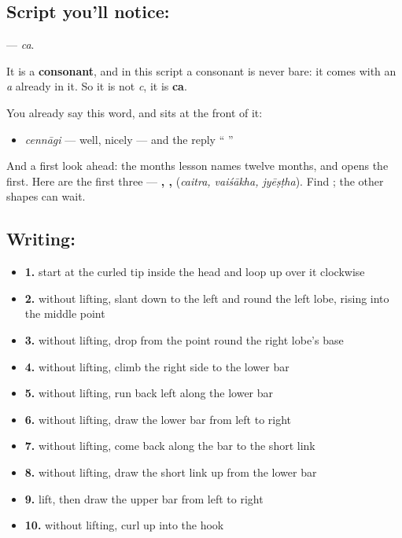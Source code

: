 \subsection*{Script you'll notice: }
\textbf{} — \emph{ca}.

It is a \textbf{consonant}, and in this script a consonant is never bare: it comes with an \emph{a} already in it. So it is not \emph{c}, it is \textbf{ca}.

You already say this word, and  sits at the front of it:

\begin{itemize}
\raggedright
  \item \textbf{} \emph{cennāgi} — well, nicely — and the reply \textquotedblleft{} \textquotedblright{}
\end{itemize}

And a first look ahead: the months lesson names twelve months, and  opens the first. Here are the first three — \textbf{, , } (\emph{caitra, vaiśākha, jyēṣṭha}). Find ; the other shapes can wait.

\subsection*{Writing: }

\begin{itemize}
\raggedright
  \item \textbf{1.} start at the curled tip inside the head and loop up over it clockwise
  \item \textbf{2.} without lifting, slant down to the left and round the left lobe, rising into the middle point
  \item \textbf{3.} without lifting, drop from the point round the right lobe's base
  \item \textbf{4.} without lifting, climb the right side to the lower bar
  \item \textbf{5.} without lifting, run back left along the lower bar
  \item \textbf{6.} without lifting, draw the lower bar from left to right
  \item \textbf{7.} without lifting, come back along the bar to the short link
  \item \textbf{8.} without lifting, draw the short link up from the lower bar
  \item \textbf{9.} lift, then draw the upper bar from left to right
  \item \textbf{10.} without lifting, curl up into the hook
\end{itemize}

